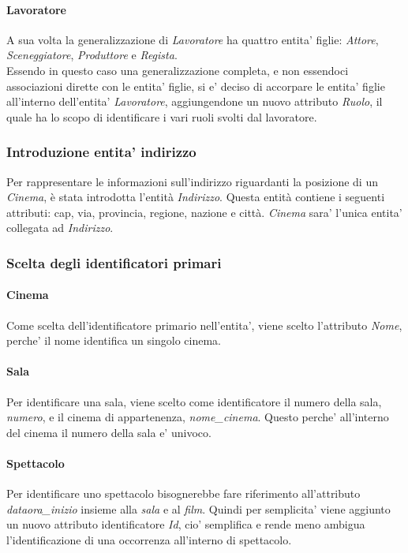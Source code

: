 \documentclass[10pt]{article}
\begin{document}
	\paragraph{Lavoratore}
	A sua volta la generalizzazione di \textit{Lavoratore} ha quattro entita' figlie: \textit{Attore}, \textit{Sceneggiatore}, \textit{Produttore} e \textit{Regista}.\\
	Essendo in questo caso una generalizzazione completa, e non essendoci associazioni dirette con le entita' figlie, si e' deciso di accorpare le entita' figlie all'interno dell'entita' \textit{Lavoratore}, aggiungendone un nuovo attributo \textit{Ruolo}, il quale ha lo scopo di identificare i vari ruoli svolti dal lavoratore.
	\subsubsection{Introduzione entita' indirizzo}
	Per rappresentare le informazioni sull’indirizzo riguardanti la posizione di un \textit{Cinema}, è stata introdotta l’entità \textit{Indirizzo}. Questa entità contiene i seguenti attributi: cap, via, provincia, regione, nazione e città. \textit{Cinema} sara' l'unica entita' collegata ad \textit{Indirizzo}.
	\subsubsection{Scelta degli identificatori primari}
	\paragraph{Cinema}
	Come scelta dell'identificatore primario nell'entita', viene scelto l'attributo \textit{Nome}, perche' il nome identifica un singolo cinema.
	\paragraph{Sala}
	Per identificare una sala, viene scelto come identificatore il numero della sala, \textit{numero}, e il cinema di appartenenza, \textit{nome\_cinema}. Questo perche' all'interno del cinema il numero della sala e' univoco.
	\paragraph{Spettacolo}
	Per identificare uno spettacolo bisognerebbe fare riferimento all'attributo \textit{dataora\_inizio} insieme alla \textit{sala} e al \textit{film}. Quindi per semplicita' viene aggiunto un nuovo attributo identificatore \textit{Id}, cio' semplifica e rende meno ambigua l'identificazione di una occorrenza all'interno di spettacolo.
\end{document}

